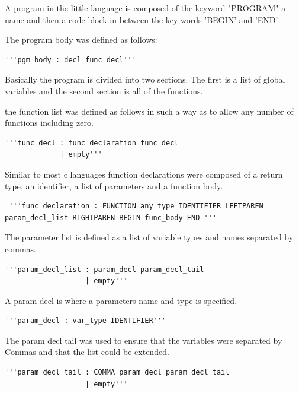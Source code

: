 \documentclass[12pt]{article}
\begin{document}
           A program in the little language is composed of the keyword "PROGRAM" a name and then a code block in between the key words 'BEGIN' and 'END'
           
           The program body was defined as follows:
           \begin{verbatim}
'''pgm_body : decl func_decl'''
           \end{verbatim}
           
           Basically the program is divided into two sections.  The first is a list of global variables and the second section is all of the functions.
           
           the function list was defined as follows in such a way as to allow any number of functions including zero.
           
           \begin{verbatim}
'''func_decl : func_declaration func_decl
             | empty'''
            \end{verbatim}
            
            Similar to most c languages function declarations were composed of a return type, an identifier, a list of parameters and a function body.
            
            \begin{verbatim}
 '''func_declaration : FUNCTION any_type IDENTIFIER LEFTPAREN param_decl_list RIGHTPAREN BEGIN func_body END '''
           \end{verbatim}
           
           The parameter list is defined as a list of variable types and names separated by commas.
           
            \begin{verbatim}
'''param_decl_list : param_decl param_decl_tail
                   | empty'''
           \end{verbatim}
           
            A param decl is where a parameters name and type is specified.
            
            \begin{verbatim}
'''param_decl : var_type IDENTIFIER'''
           \end{verbatim}
                        
           The param decl tail was used to ensure that the variables were separated by Commas and that the list could be extended.
           
           \begin{verbatim}
'''param_decl_tail : COMMA param_decl param_decl_tail
                   | empty'''
           \end{verbatim}
           
\end{document}
